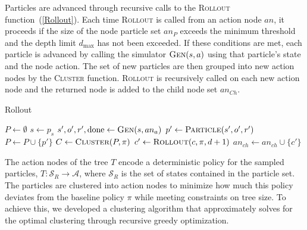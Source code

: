 \documentclass[letterpaper]{article} %
\begin{document}
Particles are advanced through recursive calls to the \textsc{Rollout} function~(\cref{Rollout}).
Each time \textsc{Rollout} is called from an action node $an$, it proceeds if the size of the node particle set $an_P$ exceeds the minimum threshold and the depth limit $d_{\max}$ has not been exceeded.
If these conditions are met, each particle is advanced by calling the simulator $\textsc{Gen}(s, a)$ using that particle's state and the node action.
The set of new particles are then grouped into new action nodes by the \textsc{Cluster} function.
\textsc{Rollout} is recursively called on each new action node and the returned node is added to the child node set $an_{Ch}$.
\begin{algorithm}[ht]
\caption{Rollout}\label{Rollout}
\begin{algorithmic}[1]
            \State $P \gets \emptyset$
                \State $s \gets p_s$
                \State $s', o', r', \text{done} \gets \textsc{Gen}(s, an_a)$
                    \State $p' \gets \textsc{Particle}(s', o', r')$
                    \State $P \gets P \cup \{ p' \}$
                \EndIf
            \EndFor
            \State $C \gets \textsc{Cluster}(P, \pi)$
                \State $c' \gets \textsc{Rollout}(c, \pi, d + 1)$
                \State $an_{ch} \gets an_{ch} \cup \{ c' \}$
            \EndFor
        \EndIf
        \State \Return {}
    \EndProcedure
\end{algorithmic}
\end{algorithm}

The action nodes of the tree $T$ encode a deterministic policy for the sampled particles, $T: \mathcal{S}_R \to \mathcal{A}$, where $\mathcal{S}_R$ is the set of states contained in the particle set.
The particles are clustered into action nodes to minimize how much this policy deviates from the baseline policy $\pi$ while meeting constraints on tree size.
To achieve this, we developed a clustering algorithm that approximately solves for the optimal clustering through recursive greedy optimization.
\end{document}
